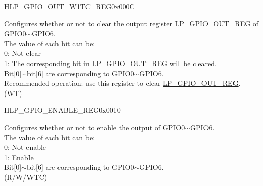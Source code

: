\begin{register}{H}{LP\_GPIO\_OUT\_W1TC\_REG}{0x000C}\label{regdesc:LPGPIOOUTW1TCREG}
%
%
\regnewline%
\begin{regdesc}\begin{reglist}
\label{fielddesc:LPGPIOOUTW1TC}\item [LP\_GPIO\_OUT\_W1TC] Configures whether or not to clear the output register \hyperref[regdesc:LPGPIOOUTREG]{LP\_GPIO\_OUT\_REG} of GPIO0$\sim$GPIO6.\\
The value of each bit can be:\\
0: Not clear\\
1: The corresponding bit in \hyperref[regdesc:LPGPIOOUTREG]{LP\_GPIO\_OUT\_REG} will be cleared.\\
Bit[0]$\sim$bit[6] are corresponding to GPIO0$\sim$GPIO6.\\
Recommended operation: use this register to clear \hyperref[regdesc:LPGPIOOUTREG]{LP\_GPIO\_OUT\_REG}.\\
(WT)
\end{reglist}\end{regdesc}
\end{register}


\begin{register}{H}{LP\_GPIO\_ENABLE\_REG}{0x0010}\label{regdesc:LPGPIOENABLEREG}
%
%
\regnewline%
\begin{regdesc}\begin{reglist}
\label{fielddesc:LPGPIOENABLEDATA}\item [LP\_GPIO\_ENABLE\_DATA] Configures whether or not to enable the output of GPIO0$\sim$GPIO6.\\
The value of each bit can be:\\
0: Not enable\\
1: Enable\\
Bit[0]$\sim$bit[6] are corresponding to GPIO0$\sim$GPIO6.\\
 (R/W/WTC)
\end{reglist}\end{regdesc}
\end{register}


